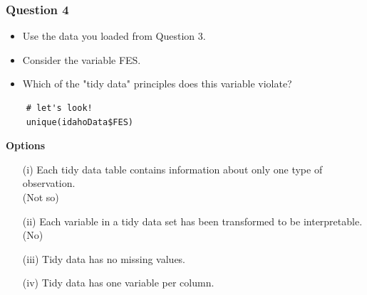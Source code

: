 \documentclass{beamer}
\begin{document}
\begin{frame}[fragile]
\frametitle{Question 4}

\begin{itemize}
	\item Use the data you loaded from Question 3. 
	\item Consider the variable FES. 
	\item Which of the "tidy data" principles does this variable violate?
\end{itemize}

%

\begin{framed} 
	\begin{verbatim}
	# let's look!
	unique(idahoData$FES)
	\end{verbatim}
\end{framed} 

\end{frame}

\begin{frame}


\textbf{Options}
\begin{itemize}
	\item[(i)]  Each tidy data table contains information about only one type of observation.\\
	(Not so)
	
	\item[(ii)]  Each variable in a tidy data set has been transformed to be interpretable.
	(No)
	
	\item[(iii)]  Tidy data has no missing values.
	
	\item[(iv)]  Tidy data has one variable per column.
\end{itemize}
\end{frame}
\end{document}
